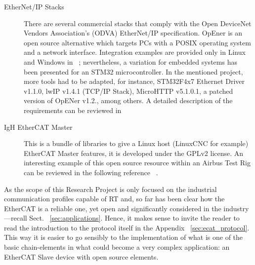 \begin{description}
    \item[EtherNet/IP Stacks] There are several commercial stacks that comply with the Open DeviceNet Vendors Association's (ODVA) EtherNet/IP specification. 
    OpEner is an open source alternative which targets PCs with a POSIX operating system and a network interface. 
    Integration examples are provided only in Linux and Windows in ~\cite{opener_stack}; %
    nevertheless, a variation for embedded systems has been presented for an STM32 microcontroller. In the mentioned project, more tools had to be adapted, for instance,
    STM32F4x7 Ethernet Driver v1.1.0, lwIP v1.4.1 (TCP/IP Stack), MicroHTTP v5.1.0.1, a patched version of OpENer v1.2., among others. A detailed description
    of the requirements can be reviewed in ~\cite{opener_stm32}%
    \item[IgH EtherCAT Master] This is a bundle of libraries to give a Linux host (LinuxCNC for example) EtherCAT Master features, it is developed under the GPLv2 license. 
    An interesting example of this open source resource within an Airbus Test Rig can be reviewed in the following reference ~\cite{ecatstack_igh}. %
\end{description}

As the scope of this Research Project is only focused on the industrial communication profiles capable of RT and, so far has been clear how 
the EtherCAT is a reliable one, yet open and significantly considered in the industry ---recall Sect. ~\ref{sec:applications}. 
Hence, it makes sense to invite the reader to read the introduction to the protocol itself in the Appendix ~\ref{sec:ecat_protocol}. 
This way it is easier to go sensibly to the implementation of what is one of the basic chain-elements in what could become a very complex application: 
an EtherCAT Slave device with open source elements.

